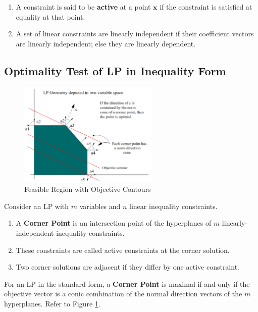 \documentclass{article}
\begin{document}
\begin{enumerate}
    \item A constraint is said to be \textbf{active} at a point $\mathbf{x}$ if the constraint is satisfied at equality at that point. 
    \item A set of linear constraints are linearly independent if their coefficient vectors are linearly independent; else they are linearly dependent. 
\end{enumerate}

\subsection{Optimality Test of LP in Inequality Form}

\begin{figure}[H]
    \centering
    \includegraphics[width=0.6\textwidth]{Images/LPGeometry.png}
    \caption{Feasible Region with Objective Contours}
    \label{fig:2-lpgeometry}
\end{figure} 

Consider an LP with $m$ variables and $n$ linear inequality constraints. \begin{enumerate}
    \item A \textbf{Corner Point} is an intersection point of the hyperplanes of $m$ linearly-independent inequality constraints. 
    \item These constraints are called active constraints at the corner solution.
    \item Two corner solutions are adjacent if they differ by one active constraint.
\end{enumerate}

\begin{theorem}
    For an LP in the standard form, a \textbf{Corner Point} is maximal if and only if the objective vector is a conic combination of the normal direction vectors of the $m$ hyperplanes. Refer to Figure \ref{fig:2-lpgeometry}. 
\end{theorem}
\end{document}
